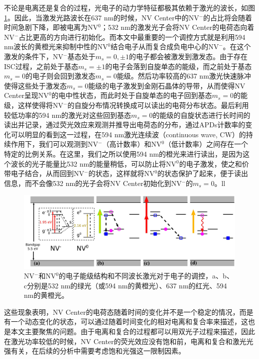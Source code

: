 \documentclass[type = bachelor]{whu-thesis}
\begin{document}
不论是电离还是复合的过程，光电子的动力学特征都极其依赖于激光的波长，如图 \ref{fig: Different Wavelength}。因此，当激发光路波长在637 nm的时候，NV Center中的NV$^-$的占比将会随着时间急剧下降，即被电离为NV$^0$；532 nm的激发光子会将NV Center的电荷态向着NV$^-$占比更高的方向进行初始化。而本文中最重要的一个调控方式就是利用594 nm波长的黄橙光来抑制中性的NV$^0$结合电子从而复合成负电中心的NV$^-$。在这个激发的条件下，NV$^-$基态处于$m_s = 0, ±1$的电子都会被激发到激发态。由于存在ISC过程，之前处于基态$m_s = ±1$的电子会落到自旋单态的能级，而之前处于基态$m_s=0$的电子则会回到激发态$m_s=0$能级。然后功率较高的637 nm激光快速脉冲使得这些处于激发态$m_s=0$能级的电子激发到金刚石晶体的导带，从而使得NV Center呈现NV$^0$的电中性状态，而此时处于自旋单态的电子回到基态$m_s=0$的能级，这样使得将NV$^-$的自旋分布情况转换成可以读出的电荷分布状态。最后利用较低功率的594 nm的激光对这些回到基态$m_s=0$的能级的自旋状态进行长时间的读出并记录，通过荧光效应来观测并推导出电荷态的分布，通过APDs计数率的变化可以明显的看到这一过程，在594 nm激光连续波（continuous wave, CW）的持续作用下，我们可以观测到NV$^-$（高计数率）和NV$^0$（低计数率）之间存在一个特定的比例关系\cite{Waldherr2011}。在这里，我们之所以使用594 nm的橙光来进行读出，是因为这个波长的光子能量比532 nm的能量稍低，可以防止将NV$^0$的电子激发，使之和价带电子结合，从而回到NV$^-$的状态，这样就将NV$^0$的状态保护了起来，便于读出信息，而不会像532 nm的光子会将NV Center初始化到NV$^-$的$m_s=0$。ll

\begin{figure}
  \centering
  \includegraphics[width=1.0\textwidth]{figures/Chapter 3/Different Wavelength.png}
  \caption[NV$^-$和NV$^0$的电子能级结构和不同波长激光对于电子的调控]{NV$^-$和NV$^0$的电子能级结构和不同波长激光对于电子的调控，a、b、c分别是532 nm的绿光（或594 nm的黄橙光）、637 nm的红光、594 nm的黄橙光\cite{Shields2015}。}
  \label{fig: Different Wavelength}
\end{figure}

这些现象表明，NV Center的电荷态随着时间的变化并不是一个稳定的情况，而是有一个动态变化的状态，可以通过随着时间变化的相对电离和复合率来描述，这也是本文主要聚焦的问题。由于电离和复合的过程都可以用双光子过程来描述，因此在激光功率较低的时候，NV Center的荧光效应没有饱和前，电离和复合和激光光强有关，在后续的分析中需要考虑饱和光强这一限制因素。
\end{document}

